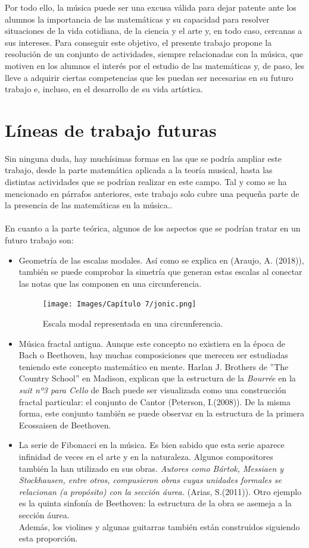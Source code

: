 \documentclass[a4paper, openright, 11pt, titlepage]{report}
\theoremstyle{definition}\newtheorem{defin}[propo]{Definition}
\theoremstyle{definition}\newtheorem{obser}[propo]{Remark}
\theoremstyle{definition}\newtheorem{ejem}[propo]{Ejemplo}
\theoremstyle{definition}\newtheorem{algoritmo}[propo]{Algoritmo}
\begin{document}
Por todo ello, la música puede ser una excusa válida para dejar patente ante los alumnos la importancia de las matemáticas y su capacidad para resolver situaciones de la vida cotidiana, de la ciencia y el arte y, en todo caso, cercanas a sus intereses. Para conseguir este objetivo, el presente trabajo propone la resolución de un conjunto de actividades, siempre relacionadas con la música, que motiven en los alumnos el interés por el estudio de las matemáticas y, de paso, les lleve a adquirir ciertas competencias que les puedan ser necesarias en su futuro trabajo e, incluso, en el desarrollo de su vida artística.
\section{Líneas de trabajo futuras}
Sin ninguna duda, hay muchísimas formas en las que se podría ampliar este trabajo, desde la parte matemática aplicada a la teoría musical, hasta las distintas actividades que se podrían realizar en este campo. Tal y como se ha mencionado en párrafos anteriores, este trabajo solo cubre una pequeña parte de la presencia de las matemáticas en la música..\\\\
En cuanto a la parte teórica, algunos de los aspectos que se podrían tratar en un futuro trabajo son: 
\begin{itemize}
    \item Geometría de las escalas modales. Así como se explica en \cite{futuras1} (Araujo, A. (2018)), también se puede comprobar la simetría que generan estas escalas al conectar las notas que las componen en una circunferencia.
    \begin{figure}[H]
        \centering
        \texttt{[image: Images/Capítulo 7/jonic.png]}
        \caption{Escala modal representada en una circunferencia.}
    \end{figure}
    \item Música fractal antigua. Aunque este concepto no existiera en la época de Bach o Beethoven, hay muchas composiciones que merecen ser estudiadas teniendo este concepto matemático en mente. Harlan J. Brothers de ''The Country School'' en Madison, explican que la estructura de la \textit{Bourrée} en la \textit{suit nº3 para Cello} de Bach puede ser visualizada como una construcción fractal particular: el conjunto de Cantor \cite{futuras2} (Peterson, I.(2008)). De la misma forma, este conjunto también se puede observar en la estructura de la primera Ecossaisen de Beethoven. 
    \item La serie de Fibonacci en la música. Es bien sabido que esta serie aparece infinidad de veces en el arte y en la naturaleza. Algunos compositores también la han utilizado en sus obras. \textit{Autores como Bártok, Messiaen y Stockhausen, entre otros, compusieron obras cuyas unidades formales se relacionan (a propósito) con la sección áurea.} \cite{futuras3} (Arias, S.(2011)). Otro ejemplo es la quinta sinfonía de Beethoven: la estructura de la obra se asemeja a la sección áurea.\\
    Además, los violines y algunas guitarras también están construidos siguiendo esta proporción. 
\end{itemize}
\end{document}
